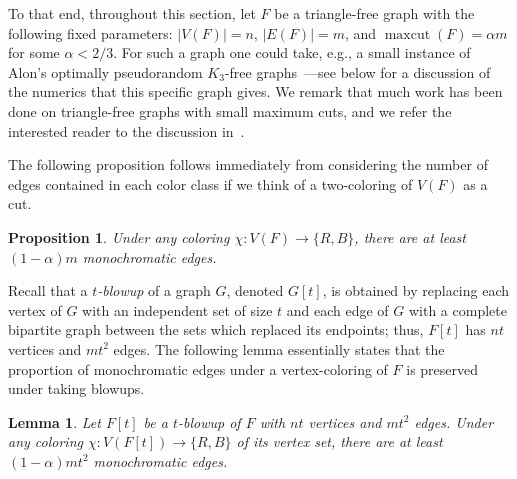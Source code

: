 \documentclass[A4paper,reqno,oneside,12pt]{amsart}
\theoremstyle{plain}
\newtheorem{lemma}[theorem]{Lemma}
\newtheorem{proposition}[theorem]{Proposition}
\theoremstyle{definition}
\def\a{\alpha}
\newcommand{\maxcut}{\operatorname{maxcut}}
\begin{document}
To that end, throughout this section, let $F$ be a triangle-free graph with the following fixed parameters:
$|V(F)| = n$, $|E(F)| = m$, and $\maxcut(F) = \a m$ for some $\a < 2/3$.
For such a graph one could take, e.g., a small instance of Alon's optimally pseudorandom $K_3$-free graphs~\cite{A94, A96}---see below for a discussion of the numerics that this specific graph gives.
We remark that much work has been done on triangle-free graphs with small maximum cuts, and we refer the interested reader to the discussion in~\cite{A96}.

The following proposition follows immediately from considering the number of edges contained in each color class if we think of a two-coloring of $V(F)$ as a cut.

\begin{proposition}
    Under any coloring $\chi: V(F) \to \{R,B\}$, there are at least $(1 - \a)m$ monochromatic edges.
\end{proposition}

Recall that a {\it $t$-blowup} of a graph $G$, denoted $G[t]$, is obtained by replacing each vertex of $G$ with an independent set of size $t$ and each edge of $G$ with a complete bipartite graph between the sets which replaced its endpoints; thus, $F[t]$ has $nt$ vertices and $mt^2$ edges.
The following lemma essentially states that the proportion of monochromatic edges under a vertex-coloring of $F$ is preserved under taking blowups.

\begin{lemma}
\label{lem: blowup-coloring}
    Let $F[t]$ be a $t$-blowup of $F$ with $nt$ vertices and $mt^2$ edges.
    Under any coloring $\chi: V(F[t]) \to \{R,B\}$ of its vertex set, there are at least $(1 - \a)mt^2$ monochromatic edges.
\end{lemma}
\end{document}

